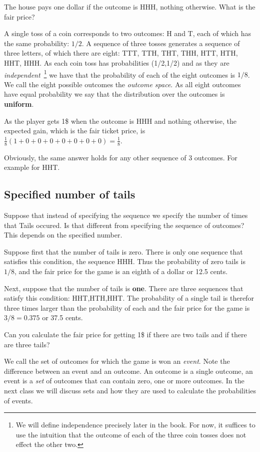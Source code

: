The house pays one dollar if the outcome is HHH, nothing otherwise. What
is the fair price?

A single toss of a coin corresponds to two outcomes: H and T, each of
which has the same probability: $1/2$. A sequence of three tosses
generates a sequence of three letters, of which there are eight: TTT,
TTH, THT, THH, HTT, HTH, HHT, HHH. As each coin toss has probabilities
(1/2,1/2) and as they are {\em independent}~\footnote{We will define
  independence precisely later in the book. For now, it suffices to
  use the intuition that the outcome of each of the three coin tosses
  does not effect the other two.} we have that the probability of each
of the eight outcomes is $1/8$. We call the eight possible outcomes
the {\em outcome space}. As all eight outcomes have equal probability
we say that the distribution over the outcomes is {\bf uniform}.

As the player gets 1\$ when the outcome is HHH and nothing otherwise,
the expected gain, which is the fair ticket price, is 
$\frac{1}{8}(1+0+0+0+0+0+0+0)=\frac{1}{8}$.

Obviously, the same answer holds for any other sequence of 3
outcomes. For example for HHT.

\subsection{Specified number of tails}

Suppose that instead of specifying the sequence we specify the number
of times that Tails occured. Is that different from specifying the
sequence of outcomes? This depends on the specified number.

Suppose first that the number of tails is zero. There is only one
sequence that satisfies this condition, the sequence HHH. Thus the
probability of zero tails is $1/8$, and the fair price for the game is
an eighth of a dollar or 12.5 cents.

Next, suppose that the number of tails is {\bf one}. There are three
sequences that satisfy this condition: HHT,HTH,HHT. The probability of
a single tail is therefor three times larger than the probability of
each and the fair price for the game is $3/8 = 0.375$ or 37.5 cents.

Can you calculate the fair price for getting 1\$ if there are two
tails and if there are three tails?

We call the set of outcomes for which the game is won an {\em
  event}. Note the difference between an event and an outcome. An
outcome is a single outcome, an event is a {\em set} of outcomes that
can contain zero, one or more outcomes. In the next class we will discuss
sets and how they are used to calculate the probabilities of events.

